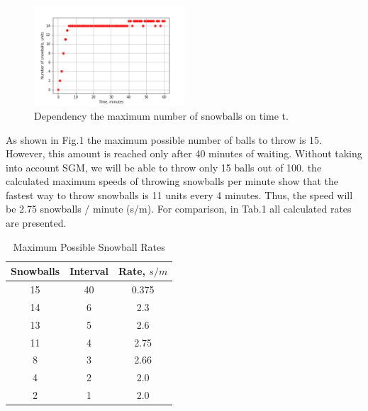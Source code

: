 \documentclass[conference]{IEEEtran}
\begin{document}
\begin{figure}[htbp]
\centerline{\includegraphics[width=0.5\textwidth]{fig1_maximum_snowball_per_round.png}}
\caption{Dependency the maximum number of snowballs on time t.}
\label{fig}
\end{figure}

As shown in Fig.1 the maximum possible number of balls to throw is 15. However, this amount is reached only after 40 minutes of waiting. Without taking into account SGM, we will be able to throw only 15 balls out of 100. the calculated maximum speeds of throwing snowballs per minute show that the fastest way to throw snowballs is 11 units every 4 minutes. Thus, the speed will be 2.75 snowballs / minute (s/m). For comparison, in Tab.1 all calculated rates are presented.

\begin{table}[htbp]
\caption{Maximum Possible Snowball Rates}
\begin{center}
\begin{tabular}{|c|c|c|}
\hline
\textbf{Snowballs}&\textbf{Interval}&\textbf{Rate, $s/m$} \\
\hline
15& 40& 0.375 \\
\hline
14& 6& 2.3 \\
\hline
13& 5& 2.6 \\ 
\hline
11& 4& 2.75 \\
\hline
8& 3& 2.66 \\
\hline
4& 2& 2.0 \\
\hline
2& 1& 2.0 \\
\hline
\end{tabular}
\label{tab1}
\end{center}
\end{table}



\end{document}
